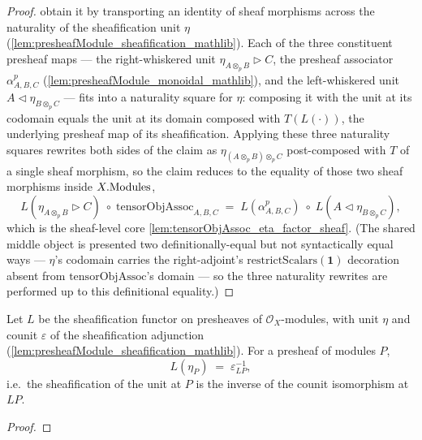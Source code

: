 \begin{proof}
  \leanok
  obtain it by transporting an identity of sheaf morphisms across the naturality of
  the sheafification unit \(\eta\) (\cref{lem:presheafModule_sheafification_mathlib}).
  Each of the three constituent presheaf maps --- the right-whiskered unit
  \(\eta_{A \otimes_{p} B} \rhd C\), the presheaf associator \(\alpha^{p}_{A,B,C}\)
  (\cref{lem:presheafModule_monoidal_mathlib}), and the left-whiskered unit
  \(A \lhd \eta_{B \otimes_{p} C}\) --- fits into a naturality square for \(\eta\):
  composing it with the unit at its codomain equals the unit at its domain composed
  with \(T(L(\cdot))\), the underlying presheaf map of its sheafification. Applying
  these three naturality squares rewrites both sides of the claim as
  \(\eta_{(A \otimes_{p} B) \otimes_{p} C}\) post-composed with \(T\) of a single
  sheaf morphism, so the claim reduces to the equality of those two sheaf morphisms
  inside \(X.\mathrm{Modules}\),
  \[
    L(\eta_{A \otimes_{p} B} \rhd C) \;\circ\; \mathrm{tensorObjAssoc}_{A,B,C}
      \;=\; L(\alpha^{p}_{A,B,C}) \;\circ\; L(A \lhd \eta_{B \otimes_{p} C}),
  \]
  which is the sheaf-level core \cref{lem:tensorObjAssoc_eta_factor_sheaf}. (The
  shared middle object is presented two definitionally-equal but not syntactically
  equal ways --- \(\eta\)'s codomain carries the right-adjoint's
  \(\mathrm{restrictScalars}(\mathbf{1})\) decoration absent from
  \(\mathrm{tensorObjAssoc}\)'s domain --- so the three naturality rewrites are
  performed up to this definitional equality.)
\end{proof}

\begin{lemma}\leanok
  \label{lem:sheafification_map_unit_eq}
  Let \(L\) be the sheafification functor on presheaves of \(\mathcal{O}_X\)-modules,
  with unit \(\eta\) and counit \(\varepsilon\) of the sheafification adjunction
  (\cref{lem:presheafModule_sheafification_mathlib}). For a presheaf of modules
  \(P\),
  \[
    L(\eta_P) \;=\; \varepsilon_{L P}^{-1},
  \]
  i.e.\ the sheafification of the unit at \(P\) is the inverse of the counit
  isomorphism at \(LP\).
\end{lemma}

\begin{proof}\leanok\end{proof}

